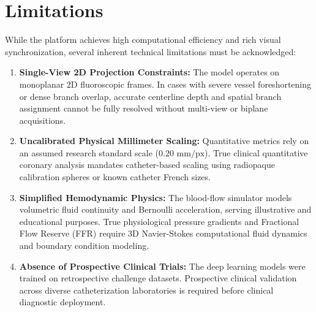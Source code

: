 \section{Limitations}
While the platform achieves high computational efficiency and rich visual synchronization, several inherent technical limitations must be acknowledged:
\begin{enumerate}
    \item \textbf{Single-View 2D Projection Constraints:} The model operates on monoplanar 2D fluoroscopic frames. In cases with severe vessel foreshortening or dense branch overlap, accurate centerline depth and spatial branch assignment cannot be fully resolved without multi-view or biplane acquisitions.
    \item \textbf{Uncalibrated Physical Millimeter Scaling:} Quantitative metrics rely on an assumed research standard scale ($0.20\text{ mm/px}$). True clinical quantitative coronary analysis mandates catheter-based scaling using radiopaque calibration spheres or known catheter French sizes.
    \item \textbf{Simplified Hemodynamic Physics:} The blood-flow simulator models volumetric fluid continuity and Bernoulli acceleration, serving illustrative and educational purposes. True physiological pressure gradients and Fractional Flow Reserve (FFR) require 3D Navier-Stokes computational fluid dynamics and boundary condition modeling.
    \item \textbf{Absence of Prospective Clinical Trials:} The deep learning models were trained on retrospective challenge datasets. Prospective clinical validation across diverse catheterization laboratories is required before clinical diagnostic deployment.
\end{enumerate}

